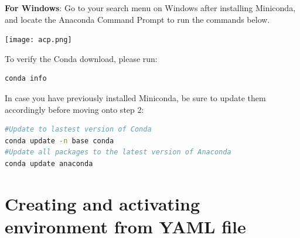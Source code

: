 \documentclass{article}
\begin{document}
\textbf{For Windows}: Go to your search menu on Windows after installing Miniconda, and locate the Anaconda Command Prompt to run the commands below.
\begin{center}
   \texttt{[image: acp.png]} 
\end{center}


To verify the Conda download, please run: 
\begin{lstlisting}[language=bash] 
conda info
\end{lstlisting}
In case you have previously installed Miniconda, be sure to update them accordingly before moving onto step 2:
\begin{lstlisting}[language=bash] 
#Update to lastest version of Conda
conda update -n base conda
#Update all packages to the latest version of Anaconda
conda update anaconda
\end{lstlisting}

\section{Creating and activating environment from YAML file}
\end{document}
